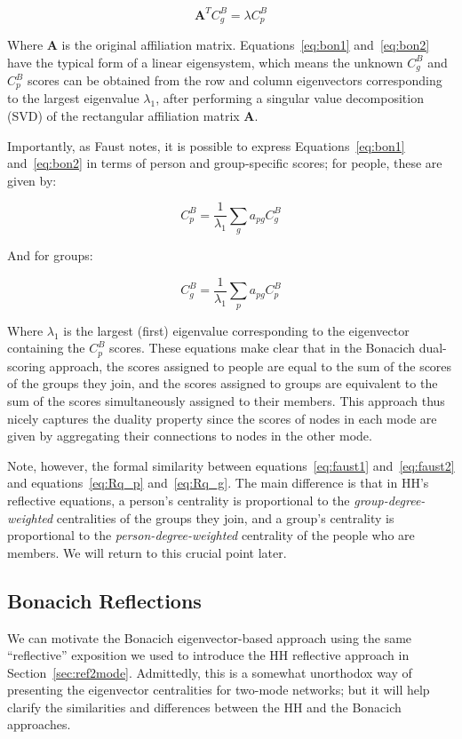 \documentclass[a4paper,fleqn]{cas-sc}
\begin{document}
\begin{equation}
    \mathbf{A}^TC^B_g = \lambda C^B_p 
    \label{eq:bon2}
\end{equation}

Where $\mathbf{A}$ is the original affiliation matrix. Equations~\ref{eq:bon1} and~\ref{eq:bon2} have the typical form of a linear eigensystem, which means the unknown $C^B_g$ and $C^B_p$ scores can be obtained from the row and column eigenvectors corresponding to the largest eigenvalue $\lambda_1$, after performing a singular value decomposition (SVD) of the rectangular affiliation matrix $\mathbf{A}$. 

Importantly, as Faust \citeyearpar[170]{faust1997centrality} notes, it is possible to express Equations~\ref{eq:bon1} and~\ref{eq:bon2} in terms of person and group-specific scores; for people, these are given by: 

\begin{equation}
    C^B_p = \frac{1}{\lambda_1}\sum_{g}a_{pg}C^B_g
    \label{eq:faust1}
\end{equation}

And for groups:

\begin{equation}
    C^B_g = \frac{1}{\lambda_1}\sum_{p}a_{pg}C^B_p
    \label{eq:faust2}
\end{equation}

Where $\lambda_1$ is the largest (first) eigenvalue corresponding to the eigenvector containing the $C^B_p$ scores. These equations make clear that in the Bonacich dual-scoring approach, the scores assigned to people are equal to the sum of the scores of the groups they join, and the scores assigned to groups are equivalent to the sum of the scores simultaneously assigned to their members. This approach thus nicely captures the duality property since the scores of nodes in each mode are given by aggregating their connections to nodes in the other mode. 

Note, however, the formal similarity between equations~\ref{eq:faust1} and~\ref{eq:faust2} and equations~\ref{eq:Rq_p} and~\ref{eq:Rq_g}. The main difference is that in HH's reflective equations, a person's centrality is proportional to the \textit{group-degree-weighted} centralities of the groups they join, and a group's centrality is proportional to the \textit{person-degree-weighted} centrality of the people who are members. We will return to this crucial point later.

\subsection{Bonacich Reflections} \label{subsec:bonref}
We can motivate the Bonacich eigenvector-based approach using the same ``reflective'' exposition we used to introduce the HH reflective approach in Section~\ref{sec:ref2mode}. Admittedly, this is a somewhat unorthodox way of presenting the eigenvector centralities for two-mode networks; but it will help clarify the similarities and differences between the HH and the Bonacich approaches. 
\end{document}
